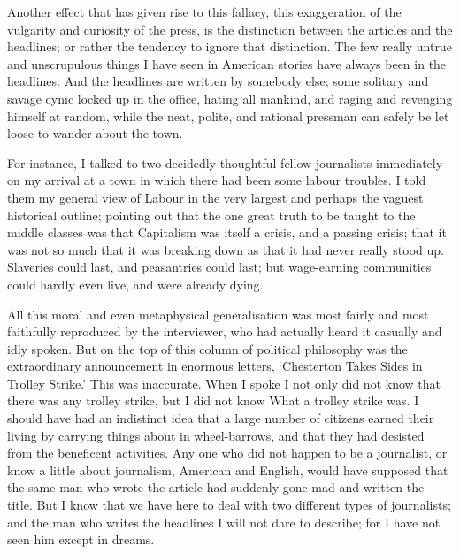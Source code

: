 \documentclass{book}
\begin{document}
Another effect that has given rise to this fallacy, this exaggeration of the vulgarity and curiosity of the press, is the distinction between the articles and the headlines; or rather the tendency to ignore that distinction. The few really untrue and unscrupulous things I have seen in American stories have always been in the headlines. And the headlines are written by somebody else; some solitary and savage cynic locked up in the office, hating all mankind, and raging and revenging himself at random, while the neat, polite, and rational pressman can safely be let loose to wander about the town.

For instance, I talked to two decidedly thoughtful fellow journalists immediately on my arrival at a town in which there had been some labour troubles. I told them my general view of Labour in the very largest and perhaps the vaguest historical outline; pointing out that the one great truth to be taught to the middle classes was that Capitalism was itself a crisis, and a passing crisis; that it was not so much that it was breaking down as that it had never really stood up. Slaveries could last, and peasantries could last; but wage-earning communities could hardly even live, and were already dying.

All this moral and even metaphysical generalisation was most fairly and most faithfully reproduced by the interviewer, who had actually heard it casually and idly spoken. But on the top of this column of political philosophy was the extraordinary announcement in enormous letters, ‘Chesterton Takes Sides in Trolley Strike.’ This was inaccurate. When I spoke I not only did not know that there was any trolley strike, but I did not know What a trolley strike was. I should have had an indistinct idea that a large number of citizens earned their living by carrying things about in wheel-barrows, and that they had desisted from the beneficent activities. Any one who did not happen to be a journalist, or know a little about journalism, American and English, would have supposed that the same man who wrote the article had suddenly gone mad and written the title. But I know that we have here to deal with two different types of journalists; and the man who writes the headlines I will not dare to describe; for I have not seen him except in dreams.
\end{document}
